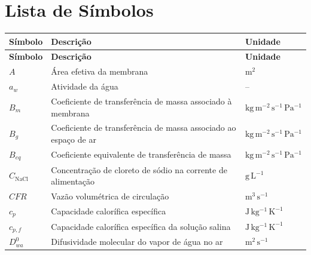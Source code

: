 
\chapter*{Lista de Símbolos}

\begin{longtable}{>{\raggedright\arraybackslash}p{3cm}
                  >{\raggedright\arraybackslash}p{9.5cm}
                  >{\raggedright\arraybackslash}p{3cm}}

\textbf{Símbolo} & \textbf{Descrição} & \textbf{Unidade} \\
\hline
\endfirsthead

\textbf{Símbolo} & \textbf{Descrição} & \textbf{Unidade} \\
\hline
\endhead

$A$ & Área efetiva da membrana & $\mathrm{m^2}$ \\

$a_w$ & Atividade da água & -- \\

$B_m$ & Coeficiente de transferência de massa associado à membrana & $\mathrm{kg\,m^{-2}\,s^{-1}\,Pa^{-1}}$ \\

$B_g$ & Coeficiente de transferência de massa associado ao espaço de ar & $\mathrm{kg\,m^{-2}\,s^{-1}\,Pa^{-1}}$ \\

$B_{eq}$ & Coeficiente equivalente de transferência de massa & $\mathrm{kg\,m^{-2}\,s^{-1}\,Pa^{-1}}$ \\

$C_{\mathrm{NaCl}}$ & Concentração de cloreto de sódio na corrente de alimentação & $\mathrm{g\,L^{-1}}$ \\

$CFR$ & Vazão volumétrica de circulação & $\mathrm{m^3\,s^{-1}}$ \\

$c_p$ & Capacidade calorífica específica & $\mathrm{J\,kg^{-1}\,K^{-1}}$ \\

$c_{p,f}$ & Capacidade calorífica específica da solução salina & $\mathrm{J\,kg^{-1}\,K^{-1}}$ \\

$D_{wa}^{0}$ & Difusividade molecular do vapor de água no ar & $\mathrm{m^2\,s^{-1}}$ \\


\end{longtable}
